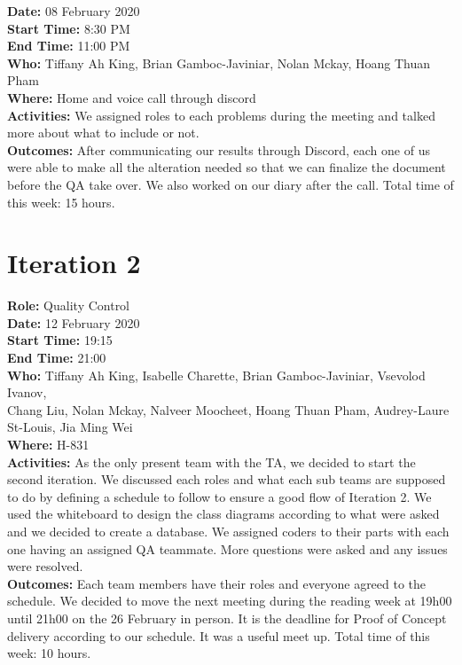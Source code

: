 \documentclass[12pt]{article}
\begin{document}
{\bf Date:} 08 February 2020\\
{\bf Start Time:} 8:30 PM\\
{\bf End Time:} 11:00 PM \\
{\bf Who:} Tiffany Ah King, Brian Gamboc-Javiniar, Nolan Mckay, Hoang Thuan Pham\\
{\bf Where:} Home and voice call through discord \\
{\bf Activities:} We assigned roles to each problems during the meeting and talked more about what to include or not. \\
{\bf Outcomes:} After communicating our results through Discord, each one of us were able to make all the alteration needed so that we can finalize the document before the QA take over. We also worked on our diary after the call. Total time of this week: 15 hours.\\



\section{Iteration 2}

{\bf Role:} Quality Control\\

{\bf Date:} 12 February 2020\\
{\bf Start Time:} 19:15\\
{\bf End Time:} 21:00\\
{\bf Who:} Tiffany Ah King, Isabelle Charette, Brian Gamboc-Javiniar, Vsevolod Ivanov,\\
Chang Liu, Nolan Mckay, Nalveer Moocheet, Hoang Thuan Pham, Audrey-Laure St-Louis, Jia Ming Wei\\
{\bf Where:} H-831\\
{\bf Activities:} As the only present team with the TA, we decided to start the second iteration. We discussed each roles and what each sub teams are supposed to do by defining a schedule to follow to ensure a good flow of Iteration 2. We used the whiteboard to design the class diagrams according to what were asked and we decided to create a database. We assigned coders to their parts with each one having an assigned QA teammate. More questions were asked and any issues were resolved. \\
{\bf Outcomes:} Each team members have their roles and everyone agreed to the schedule. We decided to move the next meeting during the reading week at 19h00 until 21h00 on the 26 February in person. It is the deadline for Proof of Concept delivery according to our schedule. It was a useful meet up. Total time of this week: 10 hours.\\
\end{document}
